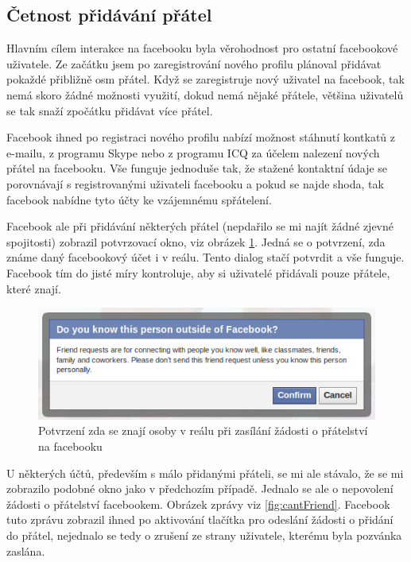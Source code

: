 \documentclass[thesis=M,czech]{FITthesis}[2013/05/10]
\begin{document}
\subsection{Četnost přidávání přátel}

Hlavním cílem interakce na facebooku byla věrohodnost pro ostatní facebookové uživatele. Ze začátku jsem po zaregistrování nového profilu plánoval přidávat pokaždé přibližně osm přátel. Když se zaregistruje nový uživatel na facebook, tak nemá skoro žádné možnosti využití, dokud nemá nějaké přátele, většina uživatelů se tak snaží zpočátku přidávat více přátel. 

Facebook ihned po registraci nového profilu nabízí možnost stáhnutí kontkatů z e-mailu, z programu Skype nebo z programu ICQ za účelem nalezení nových přátel na facebooku. Vše funguje jednoduše tak, že stažené kontaktní údaje se porovnávají s registrovanými uživateli facebooku a pokud se najde shoda, tak facebook nabídne tyto účty ke vzájemnému spřátelení.

Facebook ale při přidávání některých přátel (nepdařilo se mi najít žádné zjevné spojitosti) zobrazil potvrzovací okno, viz obrázek \ref{fig:confirmFriendship}. Jedná se o potvrzení, zda známe daný facebookový účet i v reálu. Tento dialog stačí potvrdit a vše funguje. Facebook tím do jisté míry kontroluje, aby si uživatelé přidávali pouze přátele, které znají.

\begin{figure}[h]
\begin{center}
\includegraphics[width=5in]{figures/confirm-friendship.png}
\caption{Potvrzení zda se znají osoby v reálu při zasílání žádosti o přátelství na facebooku}
\label{fig:confirmFriendship}
\end{center}
\end{figure}

U některých účtů, především s málo přidanými přáteli, se mi ale stávalo, že se mi zobrazilo podobné okno jako v předchozím případě. Jednalo se ale o nepovolení žádosti o přátelství facebookem. Obrázek zprávy viz \ref{fig:cantFriend}. Facebook tuto zprávu zobrazil ihned po aktivování tlačítka pro odeslání žádosti o přidání do přátel, nejednalo se tedy o zrušení ze strany uživatele, kterému byla pozvánka zaslána.
\end{document}
